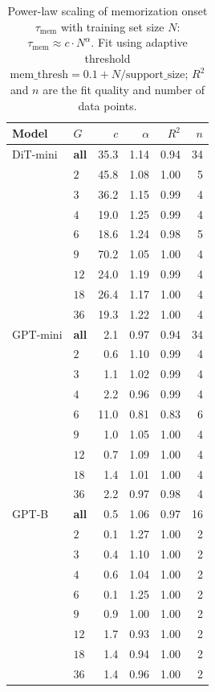 \begin{table}[h]
\centering\small
\caption{Power-law scaling of memorization onset $\tau_\mathrm{mem}$ with training set size $N$: $\tau_\mathrm{mem} \approx c \cdot N^\alpha$.  Fit using adaptive threshold $\mathrm{mem\_thresh} = 0.1 + N/\mathrm{support\_size}$; $R^2$ and $n$ are the fit quality and number of data points.}
\label{tab:mem_scaling}
\begin{tabular}{llrrrr}
\toprule
Model & $G$ & $c$ & $\alpha$ & $R^2$ & $n$ \\
\midrule
DiT-mini & \textbf{all} & 35.3 & 1.14 & 0.94 & 34 \\
 & $2$ & 45.8 & 1.08 & 1.00 & 5 \\
 & $3$ & 36.2 & 1.15 & 0.99 & 4 \\
 & $4$ & 19.0 & 1.25 & 0.99 & 4 \\
 & $6$ & 18.6 & 1.24 & 0.98 & 5 \\
 & $9$ & 70.2 & 1.05 & 1.00 & 4 \\
 & $12$ & 24.0 & 1.19 & 0.99 & 4 \\
 & $18$ & 26.4 & 1.17 & 1.00 & 4 \\
 & $36$ & 19.3 & 1.22 & 1.00 & 4 \\
\midrule
GPT-mini & \textbf{all} & 2.1 & 0.97 & 0.94 & 34 \\
 & $2$ & 0.6 & 1.10 & 0.99 & 4 \\
 & $3$ & 1.1 & 1.02 & 0.99 & 4 \\
 & $4$ & 2.2 & 0.96 & 0.99 & 4 \\
 & $6$ & 11.0 & 0.81 & 0.83 & 6 \\
 & $9$ & 1.0 & 1.05 & 1.00 & 4 \\
 & $12$ & 0.7 & 1.09 & 1.00 & 4 \\
 & $18$ & 1.4 & 1.01 & 1.00 & 4 \\
 & $36$ & 2.2 & 0.97 & 0.98 & 4 \\
\midrule
GPT-B & \textbf{all} & 0.5 & 1.06 & 0.97 & 16 \\
 & $2$ & 0.1 & 1.27 & 1.00 & 2 \\
 & $3$ & 0.4 & 1.10 & 1.00 & 2 \\
 & $4$ & 0.6 & 1.04 & 1.00 & 2 \\
 & $6$ & 0.1 & 1.25 & 1.00 & 2 \\
 & $9$ & 0.9 & 1.00 & 1.00 & 2 \\
 & $12$ & 1.7 & 0.93 & 1.00 & 2 \\
 & $18$ & 1.4 & 0.94 & 1.00 & 2 \\
 & $36$ & 1.4 & 0.96 & 1.00 & 2 \\
\bottomrule
\end{tabular}
\end{table}